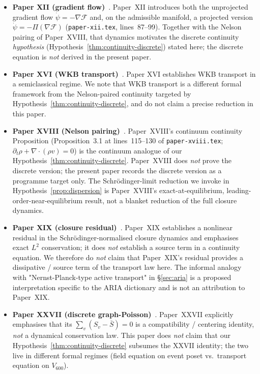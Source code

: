 \documentclass[11pt]{article}
\theoremstyle{definition}
\newcommand{\Fcal}{\mathcal{F}}
\begin{document}
\begin{itemize}
    \item \textbf{Paper XII (gradient flow)}~\citep{SmartXII}. Paper~XII introduces both the unprojected gradient flow $\dot\psi = -\nabla\Fcal$ and, on the admissible manifold, a projected version $\dot\psi = -\Pi(\nabla\Fcal)$ (\texttt{paper-xii.tex}, lines~87--99). Together with the Nelson pairing of Paper~XVIII, that dynamics motivates the discrete continuity \emph{hypothesis} (Hypothesis~\ref{thm:continuity-discrete}) stated here; the discrete equation is \emph{not} derived in the present paper.
    \item \textbf{Paper XVI (WKB transport)}~\citep{SmartXVI}. Paper XVI establishes WKB transport in a semiclassical regime. We note that WKB transport is a different formal framework from the Nelson-paired continuity targeted by Hypothesis~\ref{thm:continuity-discrete}, and do not claim a precise reduction in this paper.
    \item \textbf{Paper XVIII (Nelson pairing)}~\citep{SmartXVIII}. Paper~XVIII's continuum continuity Proposition (Proposition~3.1 at lines~115--130 of \texttt{paper-xviii.tex}; $\partial_t \rho + \nabla \cdot (\rho v) = 0$) is the continuum analogue of our Hypothesis~\ref{thm:continuity-discrete}. Paper~XVIII does \emph{not} prove the discrete version; the present paper records the discrete version as a programme target only. The Schr\"{o}dinger-limit reduction we invoke in Hypothesis~\ref{prop:dispersion} is Paper~XVIII's exact-at-equilibrium, leading-order-near-equilibrium result, not a blanket reduction of the full closure dynamics.
    \item \textbf{Paper XIX (closure residual)}~\citep{SmartXIX}. Paper~XIX establishes a nonlinear residual in the Schr\"{o}dinger-normalised closure dynamics and emphasises exact $L^2$ conservation; it does \emph{not} establish a source term in a continuity equation. We therefore do \emph{not} claim that Paper~XIX's residual provides a dissipative / source term of the transport law here. The informal analogy with "Nernst-Planck-type active transport" in \S\ref{sec:aria} is a proposed interpretation specific to the ARIA dictionary and is not an attribution to Paper~XIX.
    \item \textbf{Paper XXVII (discrete graph-Poisson)}~\citep{SmartXXVII}. Paper~XXVII explicitly emphasises that its $\sum_v (S_v - \bar S) = 0$ is a compatibility / centering identity, \emph{not} a dynamical conservation law. This paper does \emph{not} claim that our Hypothesis~\ref{thm:continuity-discrete} subsumes the XXVII identity; the two live in different formal regimes (field equation on event poset vs.\ transport equation on $V_{600}$).

\end{itemize}
\end{document}
